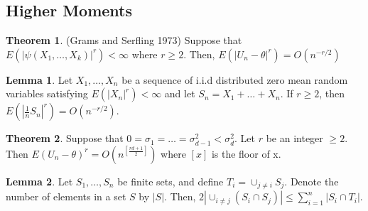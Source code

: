 \documentclass{article}
\theoremstyle{definition}
\newtheorem{theorem}{Theorem}
\newtheorem{Lemma}{Lemma}
\numberwithin{Def}{section}
\begin{document}
\subsection{Higher Moments}
\begin{theorem}(Grams and Serfling 1973)
Suppose that $E(|\psi(X_1, \dotsc, X_k)|^r)<\infty$ where $r \geq 2$. Then, $E(|U_n - \theta|^r) = O(n^{-r/2})$
\end{theorem}

\begin{Lemma}
Let $X_1, \dotsc, X_n$ be a sequence of i.i.d distributed zero mean random variables satisfying $E(|X_n|^r)<\infty$ and let $S_n = X_1 + \dotsc + X_n$. If $r \geq 2$, then $E(|\frac{1}{n}S_n|^r) = O(n^{-r/2})$.
\end{Lemma}

\begin{theorem}
Suppose that $0 = \sigma_1 = \dotsc = \sigma_{d-1}^2<\sigma_d^2$. Let $r$ be an integer $\geq 2$. Then $E(U_n - \theta)^r = O(n^{[\frac{rd + 1}{2}]})$ where $[x]$ is the floor of x. 
\end{theorem}

\begin{Lemma}
Let $S_1, \dotsc, S_n$ be finite sets, and define $T_i = \cup_{j \neq i}S_j$. Denote the number of elements in a set $S$ by $|S|$. Then, $2|\cup_{i \neq j}(S_i \cap S_j)|\leq \sum_{i=1}^n|S_i \cap T_i|$. 
\end{Lemma}
\end{document}
